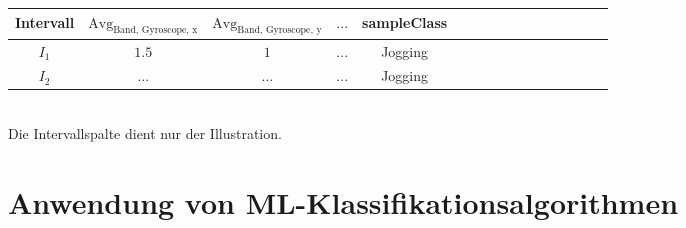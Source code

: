 \begin{tabular}{|c|c|c|c|c|c|c|c|c|c|c|c|c|c|c|c|}
	\hline 
	Intervall & $\text{Avg}_\text{Band, Gyroscope, x}$ & $\text{Avg}_\text{Band, Gyroscope, y}$  & $...$  & sampleClass  \\ 
	\hline 
	$I_1$ & $1.5$ & $1$ & $...$ & Jogging \\ 
	\hline 
	$I_2$ & $...$ & $...$ & $...$ & Jogging   \\ 
	\hline 
\end{tabular} \\

Die Intervallspalte dient nur der Illustration.


\section{Anwendung von ML-Klassifikationsalgorithmen}